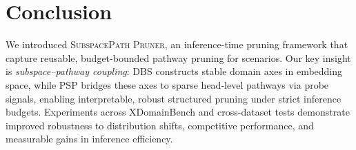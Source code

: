 \section{Conclusion}
\vspace{-1mm}
We introduced \textsc{SubspacePath Pruner}, an inference-time pruning framework that capture reusable, budget-bounded pathway pruning for scenarios.
Our key insight is \emph{subspace--pathway coupling}: DBS constructs stable domain axes in embedding space, while PSP bridges these axes to sparse head-level pathways via probe signals, enabling interpretable, robust structured pruning under strict inference budgets.
Experiments across XDomainBench and cross-dataset tests demonstrate improved robustness to distribution shifts, competitive performance, and measurable gains in inference efficiency.

